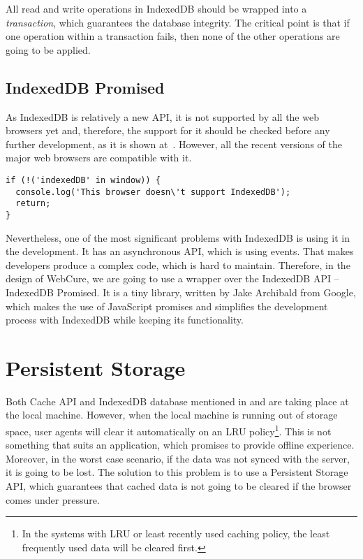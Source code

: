 All read and write operations in IndexedDB should be wrapped into a \textit{transaction}, which guarantees the database integrity. The critical point is that if one operation within a transaction fails, then none of the other operations are going to be applied. 

\subsection{IndexedDB Promised}

As IndexedDB is relatively a new API, it is not supported by all the web browsers yet and, therefore, the support for it should be checked before any further development, as it is shown at~. However, all the recent versions of the major web browsers are compatible with it. 

\begin{lstlisting}[caption={[Code for checking the support of IndexedDB API]Code, which demonstrates how one can check the support for IndexedDB API\cite{35}.}, label={lst:tech7}]
if (!('indexedDB' in window)) {
  console.log('This browser doesn\'t support IndexedDB');
  return;
}
\end{lstlisting}

Nevertheless, one of the most significant problems with IndexedDB is using it in the development. It has an asynchronous API, which is using events. That makes developers produce a complex code, which is hard to maintain. Therefore, in the design of WebCure, we are going to use a wrapper over the IndexedDB API -- IndexedDB Promised\cite{36, 48}. It is a tiny library, written by Jake Archibald from Google, which makes the use of JavaScript promises and simplifies the development process with IndexedDB while keeping its functionality.

\section{Persistent Storage}
\label{persistentstorage}

Both Cache API and IndexedDB database mentioned in  and  are taking place at the local machine. However, when the local machine is running out of storage space, user agents will clear it automatically on an LRU policy\footnote{In the systems with LRU or least recently used caching policy, the least frequently used data will be cleared first.}\cite{47}. This is not something that suits an application, which promises to provide offline experience. Moreover, in the worst case scenario, if the data was not synced with the server, it is going to be lost. The solution to this problem is to use a Persistent Storage API\cite{45, 46}, which guarantees that cached data is not going to be cleared if the browser comes under pressure.

